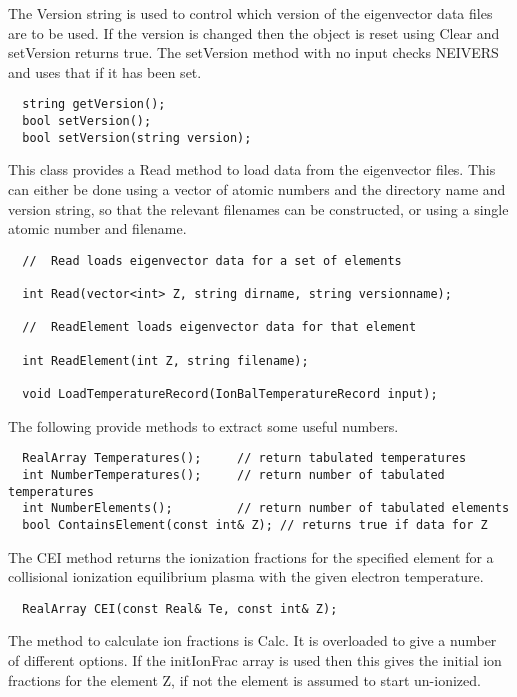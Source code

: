 \documentclass[11pt]{book}
\begin{document}
The Version string is used to control which version of the eigenvector
data files are to be used. If the version is changed then the object
is reset using Clear and setVersion returns true. The setVersion
method with no input checks NEIVERS and uses that if it has been set.

\begin{verbatim}
  string getVersion();
  bool setVersion();
  bool setVersion(string version);
\end{verbatim}

This class provides a Read method to load data from the eigenvector
files. This can either be done using a vector of atomic numbers and
the directory name and version string, so that the relevant filenames
can be constructed, or using a single atomic number and filename.

\begin{verbatim}
  //  Read loads eigenvector data for a set of elements

  int Read(vector<int> Z, string dirname, string versionname);

  //  ReadElement loads eigenvector data for that element

  int ReadElement(int Z, string filename);

  void LoadTemperatureRecord(IonBalTemperatureRecord input);
\end{verbatim}

The following provide methods to extract some useful numbers.

\begin{verbatim}
  RealArray Temperatures();     // return tabulated temperatures
  int NumberTemperatures();     // return number of tabulated temperatures
  int NumberElements();         // return number of tabulated elements
  bool ContainsElement(const int& Z); // returns true if data for Z
\end{verbatim}

The CEI method returns the ionization fractions for the specified
element for a collisional ionization equilibrium plasma with the given
electron temperature.

\begin{verbatim}
  RealArray CEI(const Real& Te, const int& Z);
\end{verbatim}

The method to calculate ion fractions is Calc. It is overloaded to
give a number of different options. If the initIonFrac array is used
then this gives the initial ion fractions for the element Z, if not
the element is assumed to start un-ionized. 
\end{document}
